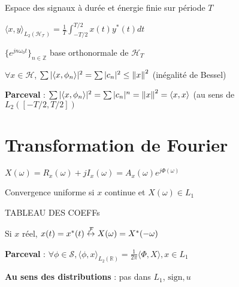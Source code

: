 \begin{myitemize}

\item Espace des signaux à durée et énergie finie sur période $T$

\item $\langle x,y \rangle_{L_2(\mathcal{H_T})} = \frac{1}{T} \int_{-T/2}^{T/2} x(t)y^*(t)dt$

\item $\{e^{jn\omega_0 t}\}_{n\in\mathbb{Z}}$ base orthonormale de $\mathcal{H}_T$

\item $\forall x \in \mathcal{H}$, $\sum |\langle x, \phi_n \rangle|^2 = \sum |c_n|^2 \leq \left\lVert x\right\rVert^2$ (inégalité de Bessel)

\item \textbf{Parceval} : $\sum |\langle x, \phi_n \rangle|^2 = \sum |c_n|^n = \left\lVert x\right\rVert^2 = \langle x,x \rangle$ (au sens de $L_2([-T/2,T/2])$

\end{myitemize}


\section{Transformation de Fourier}

$X(\omega) = R_x(\omega) + jI_x(\omega) = A_x(\omega) e^{j\Phi(\omega)}$

Convergence uniforme si $x$ continue et $X(\omega) \in L_1$

TABLEAU DES COEFFs

Si $x$ réel, $x(t) = x^*(t) \stackrel{\mathcal{F}}{\leftrightarrow} X(\omega) = X^*(-\omega)$

\textbf{Parceval} : $\forall \phi \in \mathcal{S}, \langle \phi,x \rangle_{L_2(\mathbb{R})} = \frac{1}{2\pi} \langle \Phi, X \rangle, x \in L_1$

\textbf{Au sens des distributions} : pas dans $L_1$, $\text{sign}, u$



